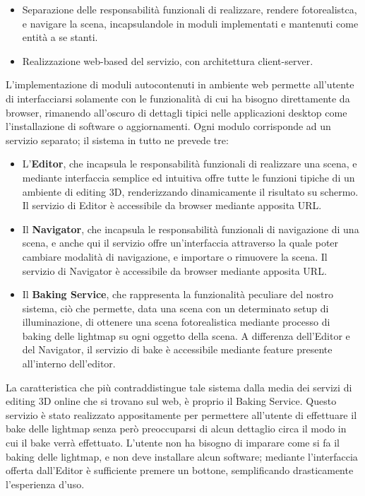 \begin{itemize}
\item Separazione delle responsabilità funzionali di realizzare, rendere fotorealistca, e navigare la scena, incapsulandole in moduli implementati e mantenuti come entità a se stanti.
\item Realizzazione  web-based del servizio, con architettura client-server. 
\end{itemize}
L’implementazione di moduli autocontenuti in ambiente web permette all’utente di interfacciarsi solamente con le funzionalità di cui ha bisogno direttamente da browser, rimanendo all’oscuro di dettagli tipici nelle applicazioni desktop come l’installazione di software o aggiornamenti. Ogni modulo corrisponde ad un servizio separato; il sistema in tutto ne prevede tre:
\begin{itemize}
\item L'\textbf{Editor}, che incapsula le responsabilità funzionali di realizzare una scena, e mediante interfaccia semplice ed intuitiva offre tutte le funzioni tipiche di un ambiente di editing 3D, renderizzando dinamicamente il risultato su schermo. Il servizio di Editor è accessibile da browser mediante apposita URL.
\item Il \textbf{Navigator}, che incapsula le responsabilità funzionali di navigazione di una scena, e anche qui il servizio offre un’interfaccia attraverso la quale poter cambiare modalità di navigazione, e importare o rimuovere la scena. Il servizio di Navigator è accessibile da browser mediante apposita URL.
\item Il \textbf{Baking Service}, che rappresenta la funzionalità peculiare del nostro sistema, ciò che permette, data una scena con un determinato setup di illuminazione, di ottenere una scena fotorealistica mediante processo di baking delle lightmap su ogni oggetto della scena. A differenza dell’Editor e del Navigator, il servizio di bake è accessibile mediante feature presente all’interno dell’editor.
\end{itemize}
La caratteristica che più contraddistingue tale sistema dalla media dei servizi di editing 3D online che si trovano sul web, è proprio il Baking Service.
Questo servizio è stato realizzato appositamente per permettere all’utente di effettuare il bake delle lightmap senza però preoccuparsi di alcun dettaglio circa il modo in cui il bake verrà effettuato. L’utente non ha bisogno di imparare come si fa il baking delle lightmap, e non deve installare alcun software; mediante l’interfaccia offerta dall’Editor è sufficiente premere un bottone, semplificando drasticamente l’esperienza d’uso. 
